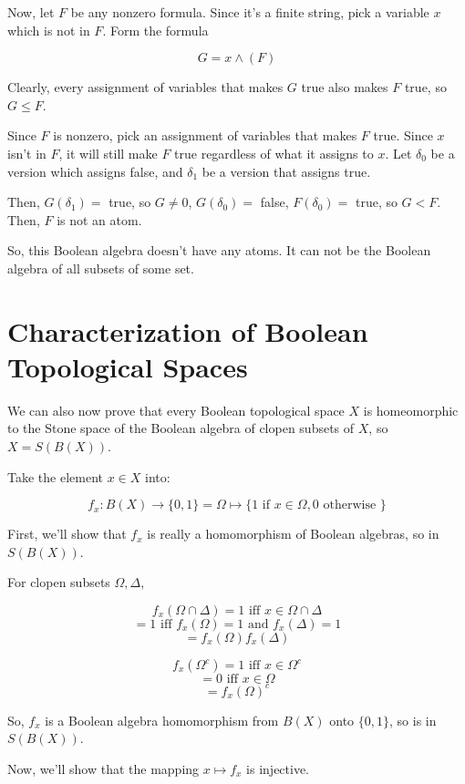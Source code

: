 \documentclass{article}
\begin{document}
        Now, let $F$ be any nonzero formula. Since it's a finite string, pick a variable
        $x$ which is not in $F$. Form the formula

        \[G = x \wedge (F)\]

        Clearly, every assignment of variables that makes $G$ true also makes $F$
        true, so $G \leq F$.

        Since $F$ is nonzero, pick an assignment of variables that makes $F$
        true. Since $x$ isn't in $F$, it will still make $F$ true regardless of
        what it assigns to $x$. Let $\delta_0$ be a version which assigns false,
        and $\delta_1$ be a version that assigns true.

        Then, $G(\delta_1) = $ true, so $G \neq 0$, $G(\delta_0) = $ false,
        $F(\delta_0) = $ true, so $G < F$. Then, $F$ is not an atom.

        So, this Boolean algebra doesn't have any atoms. It can not be the
        Boolean algebra of all subsets of some set.

    \section{Characterization of Boolean Topological Spaces}

      We can also now prove that every Boolean topological space $X$ is
      homeomorphic to the Stone space of the Boolean algebra of clopen subsets
      of $X$, so $X = S(B(X))$.

      Take the element  $x \in X$ into:

      \[f_x: B(X) \rightarrow \{0,1\} = \Omega \mapsto \{1 \text { if } x \in
      \Omega, 0 \text { otherwise }\}\]

      First, we'll show that $f_x$ is really a homomorphism of Boolean algebras,
      so in $S(B(X))$.

      For clopen subsets $\Omega, \Delta$,

      \[f_x(\Omega \cap \Delta) = 1 \text{ iff } x \in \Omega \cap \Delta\]
      \[= 1 \text{ iff } f_x(\Omega) = 1 \text{ and } f_x(\Delta) = 1\]
      \[= f_x(\Omega)f_x(\Delta)\]

      \[f_x(\Omega^c) = 1 \text{ iff } x \in \Omega^c\]
      \[ = 0 \text{ iff } x \in \Omega\]
      \[ = f_x(\Omega)^c\]

      So, $f_x$ is a Boolean algebra homomorphism from $B(X)$ onto $\{0,1\}$, so
      is in $S(B(X))$.

      Now, we'll show that the mapping $x \mapsto f_x$ is injective.
\end{document}
